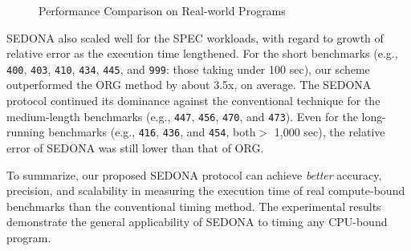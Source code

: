 \documentclass[letter]{ieice}
\begin{document}
\begin{figure}[t]
{		\label{fig:matc_std}
	}
	\vspace{-.1in}
	\caption{{\color{blue}Performance Comparison on Real-world Programs~\label{fig:synprog_test}}}
\vspace{-.2in}
\end{figure}

SEDONA also scaled well for the SPEC workloads, 
with regard to growth of relative error as the execution time lengthened.
For the short benchmarks 
(e.g., {\tt 400}, {\tt 403}, {\tt 410}, 
{\tt 434}, {\tt 445}, and {\tt 999}: those taking \hbox{under} 100 sec), 
our scheme outperformed the ORG method by about 3.5x, on average. 
The SEDONA protocol continued its dominance against the conventional technique 
for the medium-length benchmarks (e.g., {\tt 447}, {\tt 456}, {\tt 470}, and {\tt 473}).
{\color{blue}Even for the long-running benchmarks (e.g., {\tt 416}, {\tt 436}, and {\tt 454}, both$>$ 1,000 sec), 
the relative error of \hbox{SEDONA} was still lower than that of ORG.}

To summarize, our proposed SEDONA protocol can achieve {\em better} accuracy,
precision, and scalability in measuring the execution time of real \hbox{compute-bound} benchmarks than the conventional timing method. 
{\color{blue}The experimental results demonstrate 
the general applicability of SEDONA to timing any CPU-bound program.}
\end{document}
